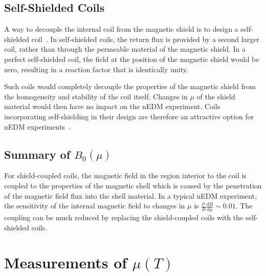 \documentclass[review]{elsarticle}
\begin{document}
\subsection{Self-Shielded Coils}

A way to decouple the internal coil from the magnetic shield is to
design a self-shielded
coil~\cite{bib:cpviolwithoutstrangeness,bib:someotherselfshieldedcoilpapers}.
In self-shielded coils, the return flux is provided by a second larger
coil, rather than through the permeable material of the magnetic
shield.  In a perfect self-shielded coil, the field at the position of
the magnetic shield would be zero, resulting in a reaction factor that
is identically unity.

Such coils would completely decouple the properties of the magnetic
shield from the homogeneity and stability of the coil itself.  Changes
in $\mu$ of the shield material would then have no impact on the nEDM
experiment.  Coils incorporating self-shielding in their design are
therefore an attractive option for nEDM
experiments~\cite{bib:cpviolwithoutstrangeness}.



\subsection{Summary of $B_0(\mu)$}

For shield-coupled coils, the magnetic field in the region interior
to the coil is coupled to the properties of the magnetic shell which is caused
by the penetration of the magnetic field flux into the shell material. In a
typical nEDM experiment, the sensitivity of the internal magnetic
field to changes in $\mu$ is $\frac{\mu}{B}\frac{dB}{d\mu}\sim 0.01$.
The coupling can be much reduced by replacing the shield-coupled coils
with the self-shielded coils.

\section{Measurements of $\mu(T)$}
\end{document}
